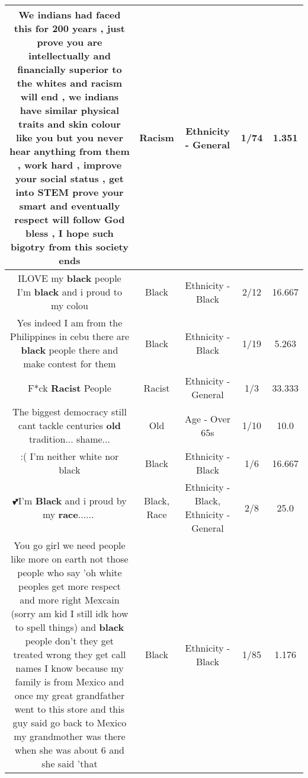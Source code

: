 \documentclass[11pt]{article}
\newlength\mylength
\begin{document}
\begin{center}
\begin{longtable}{|C{.65\mylength}|C{.30\mylength}|C{.12\mylength}|C{.12\mylength}|C{.12\mylength}|}
  \small We indians had faced this for 200 years , just prove you are intellectually and financially superior to the whites and \textbf{racism} will end , we indians have similar physical traits and skin colour like you but you never hear anything from them , work hard , improve your social status , get into STEM prove your smart and eventually respect will follow God bless , I hope such bigotry from this society ends\normalsize   & Racism & Ethnicity - General & 1/74 & 1.351 \\  \hline
  \small ILOVE my \textbf{black} people I'm \textbf{black} and i proud to my colou\normalsize   & Black & Ethnicity - Black & 2/12 & 16.667 \\  \hline
  \small Yes indeed I am from the Philippines in cebu there are \textbf{black} people there and make contest for them\normalsize   & Black & Ethnicity - Black & 1/19 & 5.263 \\  \hline
  \small F*ck \textbf{Racist} People\normalsize   & Racist & Ethnicity - General & 1/3 & 33.333 \\  \hline
  \small The biggest democracy still cant tackle centuries \textbf{old} tradition... shame...\normalsize   & Old & Age - Over 65s & 1/10 & 10.0 \\  \hline
  \small :( I'm neither white nor black\normalsize   & Black & Ethnicity - Black & 1/6 & 16.667 \\  \hline
  \small 💕I'm \textbf{Black} and i proud by my \textbf{race}......💓\normalsize   & Black, Race & Ethnicity - Black, Ethnicity - General & 2/8 & 25.0 \\  \hline
  \small You go girl we need people like more on earth not those people who say 'oh white peoples get more respect and more right Mexcain (sorry am kid I still idk how to spell things) and \textbf{black} people don't they get treated wrong they get call names I know because my family is from Mexico and once my great grandfather went to this store and this guy said go back to  Mexico my grandmother was there when she was about 6 and she said 'that\normalsize   & Black & Ethnicity - Black & 1/85 & 1.176 \\  \hline

\end{longtable}
\end{center}
\end{document}
